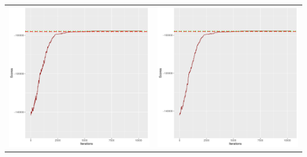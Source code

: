 \documentclass[]{scrartcl}
\begin{document}
\begin{table}[h!]
\begin{tabular}{cc}
\includegraphics[scale = 0.4]{./figs/hepar2/v1/25/boundsEvolution-10352.pdf} & 
\includegraphics[scale = 0.4]{./figs/hepar2/v1/50/boundsEvolution-10352.pdf} \\

\end{tabular}
\end{table}
\end{document}
